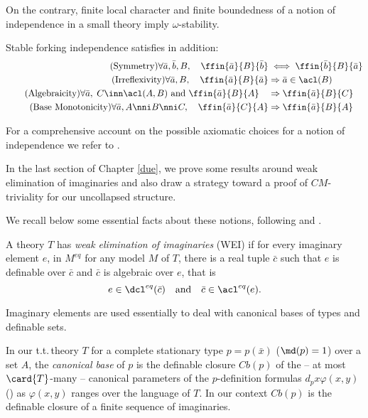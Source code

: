 On the contrary, finite local character and finite boundedness of a notion of independence in a
small theory imply $\omega$-stability.
\begin{rem}\label{re:extrafking}
Stable forking independence satisfies in addition:
\begin{align}
\tag{Symmetry}\forall\bar a,\bar b,B,\quad\ffin{\bar a}{B}{\bar b}&\iff\ffin{\bar b}{B}{\bar a}\\
\tag{Irreflexivity}\forall\bar a,B,\quad\ffin{\bar a}{B}{\bar a}&\Rightarrow \bar a\in\acl(B)\\
\tag{Algebraicity}\forall\bar a,\; C\inn\acl(A,B)\text{ and }\ffin{\bar a}{B}{A}\quad&\Rightarrow\ffin{\bar a}{B}{C}\\
\tag{Base Monotonicity}\forall \bar a,A\nni B\nni C,\quad\ffin{\bar a}{C}{A}&\Rightarrow\ffin{\bar a}{B}{A}
\end{align}
\end{rem}
For a comprehensive account on the possible axiomatic choices for a notion of independence
we refer to \cite{ad}.

\bigskip
In the last section of Chapter \ref{due}, we prove some results around
weak elimination of imaginaries and also draw a strategy toward a proof of $CM$-triviality for our uncollapsed structure.

We recall below some essential facts about these notions, following
\cite{ziebous} and \cite{cafa}.
\begin{dfn}\label{wei}
A theory $T$ has {\em weak elimination of imaginaries} (WEI) if for every imaginary element $e$,
in $M^{eq}$ for any model $M$ of $T$, there is
a real tuple $\bar c$ such that $e$ is definable over $\bar c$ and $\bar c$ is algebraic over $e$, that is
$$e\in\dcl^{eq}(\bar c)\quad\text{and}\quad\bar c\in\acl^{eq}(e).$$
\end{dfn}
Imaginary elements are used essentially to deal with canonical bases of types and definable sets.

In our t.t.{\,}theory $T$ for a complete stationary type $p=p(\bar x)$ ($\md(p)=1$) over a set $A$,
the {\em canonical base} of $p$ is the definable closure $Cb(p)$ of the -- at most $\card{T}$-many -- canonical
parameters of the $p$-definition formulas $d_{p}x\varphi(x,y)$ (\cite[p.29]{ziebous}) as $\varphi(x,y)$ ranges over the language of $T$.
In our context $Cb(p)$ is the definable closure of a finite sequence of imaginaries.

